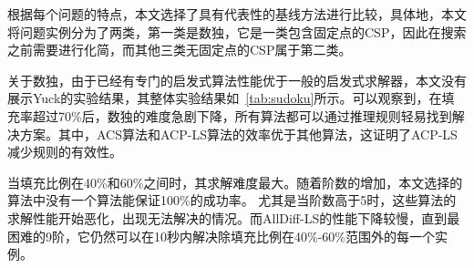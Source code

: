 根据每个问题的特点，本文选择了具有代表性的基线方法进行比较，具体地，本文将问题实例分为了两类，第一类是数独，它是一类包含固定点的CSP，因此在搜索之前需要进行化简，而其他三类无固定点的CSP属于第二类。

关于数独，由于已经有专门的启发式算法性能优于一般的启发式求解器，本文没有展示Yuck的实验结果，其整体实验结果如\tablename~\ref{tab:sudoku}所示。可以观察到，在填充率超过70\%后，数独的难度急剧下降，所有算法都可以通过推理规则轻易找到解决方案。其中，ACS算法和ACP-LS算法的效率优于其他算法，这证明了ACP-LS减少规则的有效性。

当填充比例在40\%和60\%之间时，其求解难度最大。随着阶数的增加，本文选择的算法中没有一个算法能保证100\%的成功率。
尤其是当阶数高于5时，这些算法的求解性能开始恶化，出现无法解决的情况。而AllDiff-LS的性能下降较慢，直到最困难的9阶，它仍然可以在10秒内解决除填充比例在40\%-60\%范围外的每一个实例。

